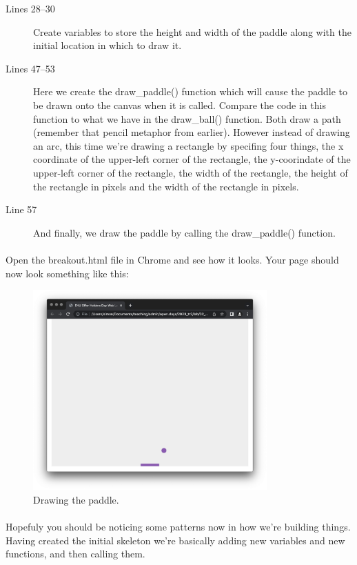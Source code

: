 \documentclass[10pt, a4paper, oneside]{article}
\begin{document}
\begin{description}
\item[Lines 28--30] Create variables to store the height and width of the paddle along with the initial location in which to draw it.
\item[Lines 47--53] Here we create the draw\_paddle() function which will cause the paddle to be drawn onto the canvas when it is called. Compare the code in this function to what we have in the draw\_ball() function. Both draw a path (remember that pencil metaphor from earlier). However instead of drawing an arc, this time we're drawing a rectangle by specifing four things, the x coordinate of the upper-left corner of the rectangle, the y-coorindate of the upper-left corner of the rectangle, the width of the rectangle, the height of the rectangle in pixels and the width of the rectangle in pixels.
\item[Line 57] And finally, we draw the paddle by calling the draw\_paddle() function.
\end{description}

\paragraph{} Open the breakout.html file in Chrome and see how it looks. Your page should now look something like this:

\begin{figure}[H]
\centering
\includegraphics[width=0.8\textwidth]{images/02_drawing+b_draw_paddle.png}
\caption{Drawing the paddle.}
\label{fig:02_drawing+b_draw_paddle}
\end{figure}


\paragraph{} Hopefuly you should be noticing some patterns now in how we're building things. Having created the initial skeleton we're basically adding new variables and new functions, and then calling them.
\end{document}
